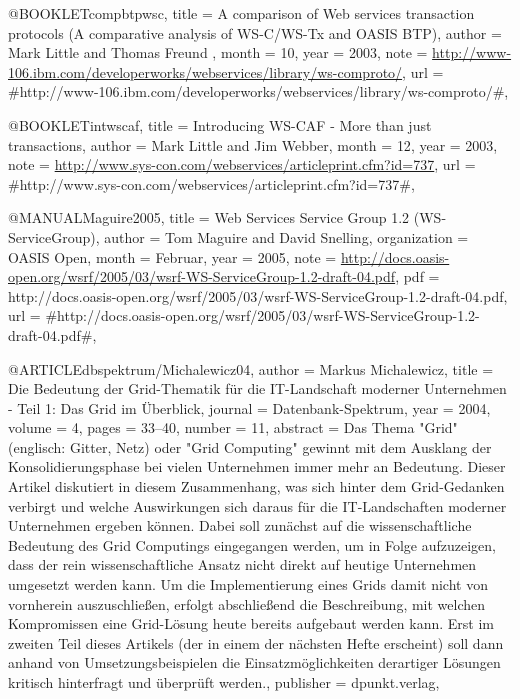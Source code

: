 @BOOKLET{compbtpwsc,
  title = {{A comparison of Web services transaction protocols (A comparative
	analysis of WS-C/WS-Tx and OASIS BTP)}},
  author = {Mark Little and Thomas Freund },
  month = {10},
  year = {2003},
  note = {\url{http://www-106.ibm.com/developerworks/webservices/library/ws-comproto/}},
  url = {#http://www-106.ibm.com/developerworks/webservices/library/ws-comproto/#},
}

@BOOKLET{intwscaf,
  title = {{Introducing WS-CAF - More than just transactions}},
  author = {Mark Little and Jim Webber},
  month = {12},
  year = {2003},
  note = {\url{http://www.sys-con.com/webservices/articleprint.cfm?id=737}},
  url = {#http://www.sys-con.com/webservices/articleprint.cfm?id=737#},
}

@MANUAL{Maguire2005,
  title = {{Web Services Service Group 1.2 (WS-ServiceGroup)}},
  author = {Tom Maguire and David Snelling},
  organization = {OASIS Open},
  month = {Februar},
  year = {2005},
  note = {\url{http://docs.oasis-open.org/wsrf/2005/03/wsrf-WS-ServiceGroup-1.2-draft-04.pdf}},
  pdf = {http://docs.oasis-open.org/wsrf/2005/03/wsrf-WS-ServiceGroup-1.2-draft-04.pdf},
  url = {#http://docs.oasis-open.org/wsrf/2005/03/wsrf-WS-ServiceGroup-1.2-draft-04.pdf#},
}

@ARTICLE{dbspektrum/Michalewicz04,
  author = {Markus Michalewicz},
  title = {{Die Bedeutung der Grid-Thematik für die IT-Landschaft moderner Unternehmen
	- Teil 1: Das Grid im Überblick}},
  journal = {Datenbank-Spektrum},
  year = {2004},
  volume = {4},
  pages = {33--40},
  number = {11},
  abstract = {Das Thema "Grid" (englisch: Gitter, Netz) oder "Grid Computing" gewinnt
	mit dem
Ausklang der Konsolidierungsphase bei vielen Unternehmen
	immer mehr an
Bedeutung. Dieser Artikel diskutiert in diesem Zusammenhang,
	was
sich hinter dem Grid-Gedanken verbirgt und welche Auswirkungen
	sich
daraus für die IT-Landschaften moderner Unternehmen ergeben
	können.
Dabei soll zunächst auf die wissenschaftliche Bedeutung des
	Grid
Computings eingegangen werden, um in Folge aufzuzeigen, dass
	der
rein wissenschaftliche Ansatz nicht direkt auf heutige Unternehmen
umgesetzt
	werden kann. Um die Implementierung eines Grids damit nicht von
vornherein
	auszuschließen, erfolgt abschließend die Beschreibung,
mit welchen
	Kompromissen eine Grid-Lösung heute bereits aufgebaut
werden kann.
	Erst im zweiten Teil dieses Artikels (der in einem der
nächsten Hefte
	erscheint) soll dann anhand von Umsetzungsbeispielen die
Einsatzmöglichkeiten
	derartiger Lösungen kritisch hinterfragt und überprüft werden.},
  publisher = {dpunkt.verlag},
}

